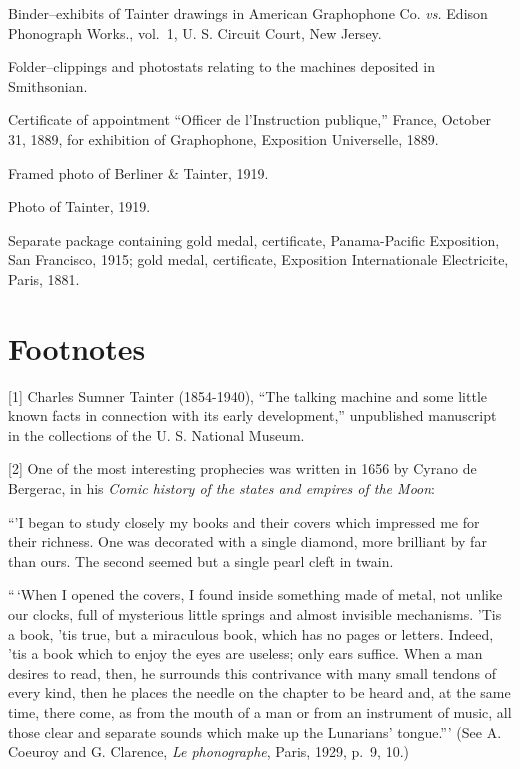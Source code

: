 \documentclass[12pt,oneside]{scrbook}
\begin{document}
  Binder--exhibits of Tainter drawings in American Graphophone Co.
  \emph{vs.} Edison Phonograph Works., vol.~1, U. S. Circuit Court, New
  Jersey.
  
  Folder--clippings and photostats relating to the machines deposited in
  Smithsonian.
  
  Certificate of appointment ``Officer de l'Instruction publique,''
  France, October 31, 1889, for exhibition of Graphophone, Exposition
  Universelle, 1889.
  
  Framed photo of Berliner \& Tainter, 1919.
  
  Photo of Tainter, 1919.
  
  Separate package containing gold medal, certificate, Panama-Pacific
  Exposition, San Francisco, 1915; gold medal, certificate, Exposition
  Internationale Electricite, Paris, 1881.
  
  \section*{Footnotes}\label{footnotes}
  
  {[}1{]} Charles Sumner Tainter (1854-1940), ``The talking machine and
  some little known facts in connection with its early development,''
  unpublished manuscript in the collections of the U. S. National Museum.
  
  {[}2{]} One of the most interesting prophecies was written in 1656 by
  Cyrano de Bergerac, in his \emph{Comic history of the states and empires
  of the Moon}:
  
  ``'I began to study closely my books and their covers which impressed me
  for their richness. One was decorated with a single diamond, more
  brilliant by far than ours. The second seemed but a single pearl cleft
  in twain.
  
  ``\,`When I opened the covers, I found inside something made of metal,
  not unlike our clocks, full of mysterious little springs and almost
  invisible mechanisms. 'Tis a book, 'tis true, but a miraculous book,
  which has no pages or letters. Indeed, 'tis a book which to enjoy the
  eyes are useless; only ears suffice. When a man desires to read, then,
  he surrounds this contrivance with many small tendons of every kind,
  then he places the needle on the chapter to be heard and, at the same
  time, there come, as from the mouth of a man or from an instrument of
  music, all those clear and separate sounds which make up the Lunarians'
  tongue.''' (See A. Coeuroy and G. Clarence, \emph{Le phonographe},
  Paris, 1929, p.~9, 10.)
  
\end{document}
